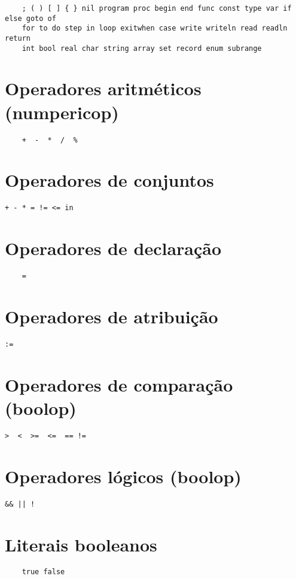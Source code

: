\begin{verbatim}
    ; ( ) [ ] { } nil program proc begin end func const type var if else goto of
    for to do step in loop exitwhen case write writeln read readln return
    int bool real char string array set record enum subrange
\end{verbatim}
\section{Operadores aritméticos (numpericop)}
\begin{verbatim}
    +  -  *  /  % 
\end{verbatim}

\section{Operadores de conjuntos}
\begin{Verbatim}[commandchars=\\\{\}]
    + - * = != <= in
\end{Verbatim}

\section{Operadores de declaração}
\begin{verbatim}
    =
\end{verbatim}

\section{Operadores de atribuição}
\begin{Verbatim}[commandchars=\\\{\}]
    :=
\end{Verbatim}

\section{Operadores de comparação (boolop)}
\begin{Verbatim}[commandchars=\\\{\}]
    >  <  >=  <=  == !=
\end{Verbatim}

\section{Operadores lógicos (boolop)}
\begin{Verbatim}[commandchars=\\\{\}]
    && || !
\end{Verbatim}

\section{Literais booleanos}
\begin{verbatim}
    true false
\end{verbatim}